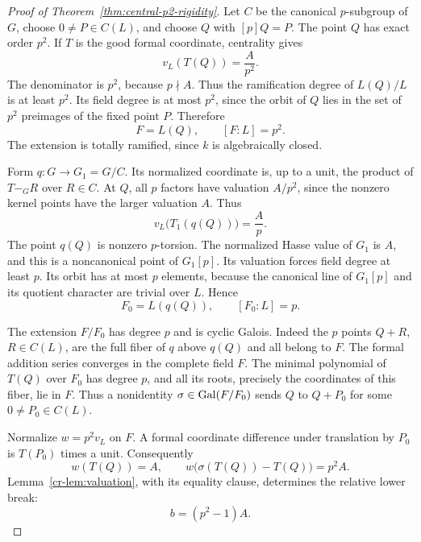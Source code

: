 \begin{proof}[Proof of Theorem~\ref{thm:central-p2-rigidity}]
Let $C$ be the canonical $p$-subgroup of $G$, choose
$0\ne P\in C(L)$, and choose $Q$ with $[p]Q=P$. The point $Q$ has exact
order $p^2$. If $T$ is the good formal coordinate, centrality gives
\begin{equation}\label{cr-eq:qval}
 v_L(T(Q))=\frac{A}{p^2}.
\end{equation}
The denominator is $p^2$, because $p\nmid A$. Thus the ramification
degree of $L(Q)/L$ is at least $p^2$. Its field degree is at most $p^2$,
since the orbit of $Q$ lies in the set of $p^2$ preimages of the fixed
point $P$. Therefore
\begin{equation}\label{cr-eq:field1}
 F=L(Q),\qquad [F:L]=p^2.
\end{equation}
The extension is totally ramified, since $k$ is algebraically closed.

Form $q:G\to G_1=G/C$. Its normalized coordinate is, up to a unit, the
product of $T-_G R$ over $R\in C$. At $Q$, all $p$ factors have valuation
$A/p^2$, since the nonzero kernel points have the larger valuation $A$.
Thus
\[
 v_L\bigl(T_1(q(Q))\bigr)=\frac Ap.
\]
The point $q(Q)$ is nonzero $p$-torsion. The normalized Hasse value of
$G_1$ is $A$, and this is a noncanonical point of $G_1[p]$. Its valuation
forces field degree at least $p$. Its orbit has at most $p$ elements,
because the canonical line of $G_1[p]$ and its quotient character are
trivial over $L$. Hence
\begin{equation}\label{cr-eq:field0}
 F_0=L(q(Q)),\qquad [F_0:L]=p.
\end{equation}

The extension $F/F_0$ has degree $p$ and is cyclic Galois. Indeed the
$p$ points $Q+R$, $R\in C(L)$, are the full fiber of $q$ above $q(Q)$ and
all belong to $F$. The formal addition series converges in the complete
field $F$. The minimal polynomial of $T(Q)$ over $F_0$ has degree $p$,
and all its roots, precisely the coordinates of this fiber, lie in $F$.
Thus a nonidentity $\sigma\in\operatorname{Gal}(F/F_0)$ sends $Q$ to $Q+P_0$ for some
$0\ne P_0\in C(L)$.

Normalize $w=p^2v_L$ on $F$. A formal coordinate difference under
translation by $P_0$ is $T(P_0)$ times a unit. Consequently
\[
 w(T(Q))=A,\qquad
 w\bigl(\sigma(T(Q))-T(Q)\bigr)=p^2A.
\]
Lemma~\ref{cr-lem:valuation}, with its equality clause, determines the
relative lower break:
\begin{equation}\label{cr-eq:break}
 b=(p^2-1)A.
\end{equation}


\end{proof}
